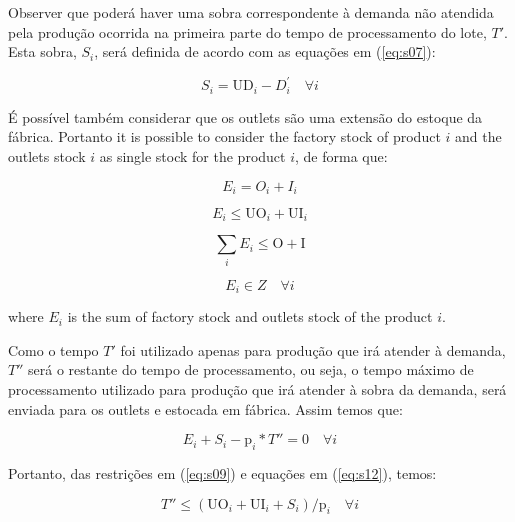 \documentclass[authoryear,manuscript,12pt]{elsarticle}
\begin{document}
Observer que poderá haver uma sobra correspondente à demanda não atendida pela produção ocorrida na primeira parte do tempo de processamento do lote, $T'$. Esta sobra, $S_i$, será definida de acordo com as equações em (\ref{eq:s07}):

\begin{equation}
\label{eq:s07}
S_i = \textrm{UD}_i - D_{i}^{'} \quad \forall i
\end{equation}

É possível também considerar que os outlets são uma extensão do estoque da fábrica. Portanto it is possible to consider the factory stock of product $i$ and the outlets stock $i$ as single stock for the product $i$, de forma que:

\begin{equation}
\label{eq:s08}
E_i = O_i + I_i
\end{equation}

\begin{equation}
\label{eq:s09}
E_i \leq \textrm{UO}_i + \textrm{UI}_i
\end{equation}

\begin{equation}
\label{eq:s10}
\sum_i {E_i} \leq \textrm{O} + \textrm{I}
\end{equation}

\begin{equation}
\label{eq:s11}
E_i \in Z \quad \forall i
\end{equation}

\noindent where $E_i$ is the sum of factory stock and outlets stock of the product $i$.

Como o tempo $T'$ foi utilizado apenas para produção que irá atender à demanda, $T''$ será o restante do tempo de processamento, ou seja, o tempo máximo de processamento utilizado para produção que irá atender à sobra da demanda, será enviada para os outlets e estocada em fábrica. Assim temos que:

\begin{equation}
\label{eq:s12}
E_i + S_i - \textrm{p}_i * T''  = 0 \quad \forall i
\end{equation}

Portanto, das restrições em (\ref{eq:s09}) e equações em (\ref{eq:s12}), temos:

\begin{equation}
\label{eq:s13}
T''  \leq (\textrm{UO}_i + \textrm{UI}_i + S_i) / \textrm{p}_i \quad \forall i
\end{equation}
\end{document}
